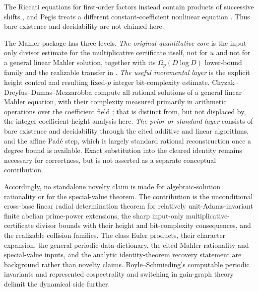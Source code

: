 The Riccati equations for first-order factors instead contain products of
successive shifts
\cite{ChyzakDreyfusDumasMezzarobba2025FirstOrderFactors}, and Pegis treats a
different constant-coefficient nonlinear equation
\cite{Pegis1996NonlinearMahler}.  Thus bare existence and decidability are not
claimed here.

The Mahler package has three levels.  \emph{The original quantitative core}
is the input-only divisor estimate for the multiplicative certificate itself,
not for \(u\) and not for a general linear Mahler solution, together with its
\(\Omega_p(D\log D)\) lower-bound family and the realizable transfer in
.  \emph{The useful
incremental layer} is the explicit height control and resulting fixed-\(p\)
integer bit-complexity estimate.  Chyzak--Dreyfus--Dumas--Mezzarobba compute
all rational solutions of a general linear Mahler equation, with their
complexity measured primarily in arithmetic operations over the coefficient
field \cite{ChyzakDreyfusDumasMezzarobba2018MahlerSolutions}; that is distinct
from, but not displaced by, the integer coefficient-height analysis here.
\emph{The prior or standard layer} consists of bare existence and decidability
through the cited additive and linear algorithms, and the affine Pad\'e step,
which is largely standard rational reconstruction once a degree bound is
available.  Exact substitution into the cleared identity remains necessary
for correctness, but is not asserted as a separate conceptual contribution.

Accordingly, no standalone novelty claim is made for algebraic-solution
rationality or for the special-value theorem.  The contribution is the
unconditional cross-base linear radial determination theorem for relatively
unit-Adams-invariant finite abelian prime-power extensions, the sharp
input-only multiplicative-certificate divisor bounds with their height and
bit-complexity consequences, and the realizable collision families.  The
class Euler products, their character expansion, the general periodic-data
dictionary, the cited Mahler rationality and special-value inputs, and the
analytic identity-theorem recovery statement are
background rather than novelty claims.  Boyle--Schmieding's computable periodic invariants
\cite{BoyleSchmieding2017FiniteGroupExtensions} and represented
cospectrality and switching in gain-graph theory
\cite{Zaslavsky1989BiasedGraphs,CavaleriDAngeliDonno2021BalanceGainGraphs,
CavaleriDonno2022Cospectrality} delimit the dynamical side further.

